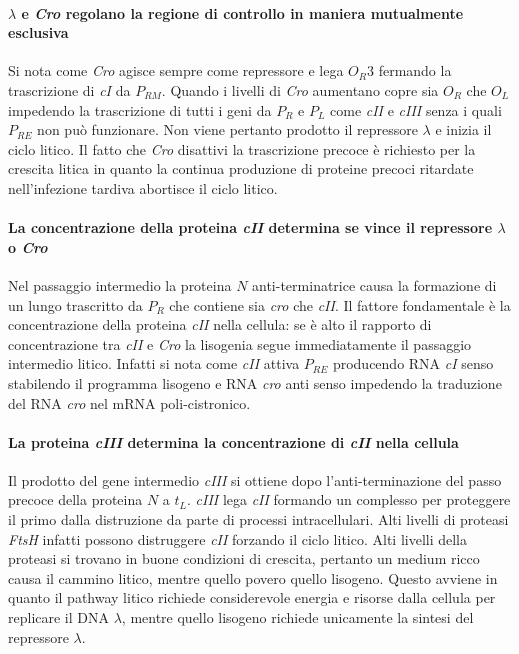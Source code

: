 \paragraph{$\lambda$ e \emph{Cro} regolano la regione di controllo in  maniera mutualmente esclusiva}
Si nota come \emph{Cro} agisce sempre come repressore e lega $O_R3$ fermando la trascrizione di \emph{cI} da $P_{RM}$. Quando i livelli di \emph{Cro} aumentano copre sia $O_R$ che $O_L$
impedendo la trascrizione di tutti i geni da $P_R$ e $P_L$ come \emph{cII} e \emph{cIII} senza i quali $P_{RE}$ non pu\`o funzionare. Non viene pertanto prodotto il repressore
$\lambda$ e inizia il ciclo litico. Il fatto che \emph{Cro} disattivi la trascrizione precoce \`e richiesto per la crescita litica in quanto la continua produzione di proteine 
precoci ritardate nell'infezione tardiva abortisce il ciclo litico. 
\paragraph{La concentrazione della proteina \emph{cII} determina se vince il repressore $\lambda$ o \emph{Cro}}
Nel passaggio intermedio la proteina $N$ anti-terminatrice causa la formazione di un lungo trascritto da $P_R$ che contiene sia \emph{cro} che \emph{cII}. Il fattore fondamentale \`e la
concentrazione della proteina \emph{cII} nella cellula: se \`e alto il rapporto di concentrazione tra \emph{cII} e \emph{Cro} la lisogenia segue immediatamente il passaggio intermedio
litico. Infatti si nota come \emph{cII} attiva $P_{RE}$ producendo RNA \emph{cI} senso stabilendo il programma lisogeno e RNA \emph{cro} anti senso impedendo la traduzione del RNA
\emph{cro} nel mRNA poli-cistronico. 
\paragraph{La proteina \emph{cIII} determina la concentrazione di \emph{cII} nella cellula}
Il prodotto del gene intermedio \emph{cIII} si ottiene dopo l'anti-terminazione del passo precoce della proteina $N$ a $t_L$. \emph{cIII} lega \emph{cII} formando un complesso per
proteggere il primo dalla distruzione da parte di processi intracellulari. Alti livelli di proteasi \emph{FtsH} infatti possono distruggere \emph{cII} forzando il ciclo litico. Alti 
livelli della proteasi si trovano in buone condizioni di crescita, pertanto un medium ricco causa il cammino litico, mentre quello povero quello lisogeno. Questo avviene in quanto
il pathway litico richiede considerevole energia e risorse dalla cellula per replicare il DNA $\lambda$, mentre quello lisogeno richiede unicamente la sintesi del repressore $\lambda$. 

